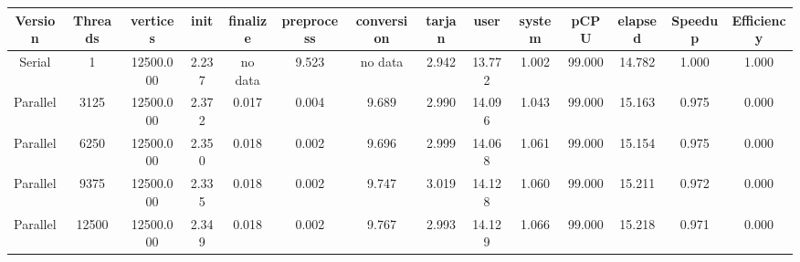 \begin{tabular}{|c|c|c|c|c|c|c|c|c|c|c|c|c|c|}
\toprule
 Version &  Threads &  vertices &  init & finalize &  preprocess & conversion &  tarjan &   user &  system &   pCPU &  elapsed &  Speedup &  Efficiency \\
\midrule
  Serial &        1 & 12500.000 & 2.237 &  no data &       9.523 &    no data &   2.942 & 13.772 &   1.002 & 99.000 &   14.782 &    1.000 &       1.000 \\
Parallel &     3125 & 12500.000 & 2.372 &    0.017 &       0.004 &      9.689 &   2.990 & 14.096 &   1.043 & 99.000 &   15.163 &    0.975 &       0.000 \\
Parallel &     6250 & 12500.000 & 2.350 &    0.018 &       0.002 &      9.696 &   2.999 & 14.068 &   1.061 & 99.000 &   15.154 &    0.975 &       0.000 \\
Parallel &     9375 & 12500.000 & 2.335 &    0.018 &       0.002 &      9.747 &   3.019 & 14.128 &   1.060 & 99.000 &   15.211 &    0.972 &       0.000 \\
Parallel &    12500 & 12500.000 & 2.349 &    0.018 &       0.002 &      9.767 &   2.993 & 14.129 &   1.066 & 99.000 &   15.218 &    0.971 &       0.000 \\
\bottomrule
\end{tabular}
